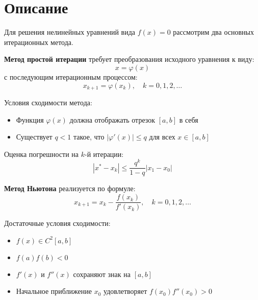 

\section*{Описание}

Для решения нелинейных уравнений вида $f(x) = 0$ рассмотрим два основных итерационных метода.

\textbf{Метод простой итерации} требует преобразования исходного уравнения к виду:
\begin{equation}
x = \varphi(x)
\end{equation}
с последующим итерационным процессом:
\begin{equation}
x_{k+1} = \varphi(x_k), \quad k = 0,1,2,\ldots
\end{equation}

Условия сходимости метода:
\begin{itemize}
\item Функция $\varphi(x)$ должна отображать отрезок $[a,b]$ в себя
\item Существует $q < 1$ такое, что $|\varphi'(x)| \leq q$ для всех $x \in [a,b]$
\end{itemize}

Оценка погрешности на $k$-й итерации:
\begin{equation}
|x^* - x_k| \leq \frac{q^k}{1-q}|x_1 - x_0|
\end{equation}

\textbf{Метод Ньютона} реализуется по формуле:
\begin{equation}
x_{k+1} = x_k - \frac{f(x_k)}{f'(x_k)}, \quad k = 0,1,2,\ldots
\end{equation}

Достаточные условия сходимости:
\begin{itemize}
\item $f(x) \in C^2[a,b]$
\item $f(a)f(b) < 0$
\item $f'(x)$ и $f''(x)$ сохраняют знак на $[a,b]$
\item Начальное приближение $x_0$ удовлетворяет $f(x_0)f''(x_0) > 0$
\end{itemize}

